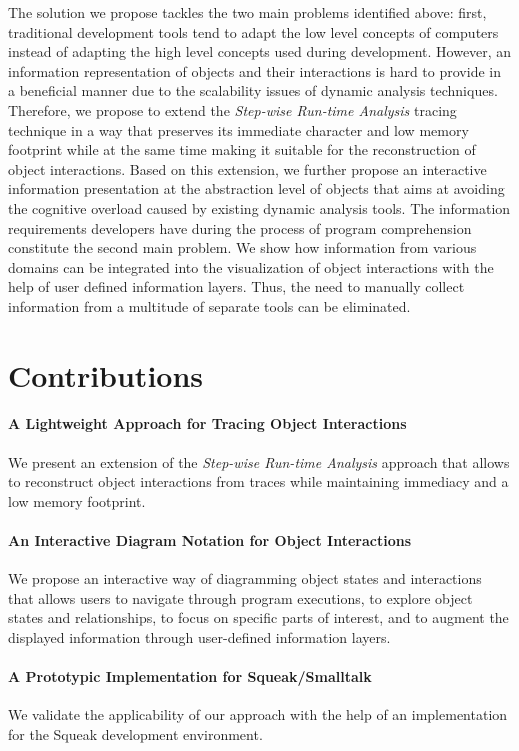 The solution we propose tackles the two main problems identified above: first, traditional development tools tend to adapt the low level concepts of computers instead of adapting the high level concepts used during development.
However, an information representation of objects and their interactions is hard to provide in a beneficial manner due to the scalability issues of dynamic analysis techniques.
Therefore, we propose to extend the \emph{Step-wise Run-time Analysis} tracing technique in a way that preserves its immediate character and low memory footprint while at the same time making it suitable for the reconstruction of object interactions.
Based on this extension, we further propose an interactive information presentation at the abstraction level of objects that aims at avoiding the cognitive overload caused by existing dynamic analysis tools.
The information requirements developers have during the process of program comprehension constitute the second main problem.
We show how information from various domains can be integrated into the visualization of object interactions with the help of user defined information layers.
Thus, the need to manually collect information from a multitude of separate tools can be eliminated.

\section{Contributions}
\label{s:contributions}

\paragraph{A Lightweight Approach for Tracing Object Interactions} We present an extension of the \emph{Step-wise Run-time Analysis} approach that allows to reconstruct object interactions from traces while maintaining immediacy and a low memory footprint.

\paragraph{An Interactive Diagram Notation for Object Interactions} We propose an interactive way of diagramming object states and interactions that allows users to navigate through program executions, to explore object states and relationships, to focus on specific parts of interest, and to augment the displayed information through user-defined information layers.

\paragraph{A Prototypic Implementation for Squeak/Smalltalk} We validate the applicability of our approach with the help of an implementation for the Squeak development environment.

